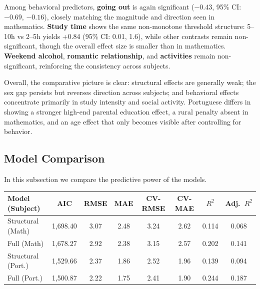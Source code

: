 \documentclass{article}
\begin{document}
\vspace{0.2em}
Among behavioral predictors, \textbf{going out} is again significant ($-0.43$, 95\% CI: $-0.69$, $-0.16$), closely matching the magnitude and direction seen in mathematics. \textbf{Study time} shows the same non-monotone threshold structure: 5--10h vs 2--5h yields +0.84 (95\% CI: 0.01, 1.6), while other contrasts remain non-significant, though the overall effect size is smaller than in mathematics. \textbf{Weekend alcohol}, \textbf{romantic relationship}, and \textbf{activities} remain non-significant, reinforcing the consistency across subjects.

\vspace{0.2em}
Overall, the comparative picture is clear: structural effects are generally weak; the sex gap persists but reverses direction across subjects; and behavioral effects concentrate primarily in study intensity and social activity. Portuguese differs in showing a stronger high-end parental education effect, a rural penalty absent in mathematics, and an age effect that only becomes visible after controlling for behavior.



\subsection{Model Comparison}


In this subsection we compare the predictive power of the models.

\vspace{-0.5em}
\begin{table}[h!]
\centering
\footnotesize
\begin{tabularx}{\textwidth}{lCCCCCCC}
\toprule
\textbf{Model (Subject)} & \textbf{AIC} & \textbf{RMSE} & \textbf{MAE} & \textbf{CV-RMSE} & \textbf{CV-MAE} & \textbf{$R^2$} & \textbf{Adj.\ $R^2$} \\
\midrule
Structural (Math) & 1{,}698.40 & 3.07 & 2.48 & 3.24 & 2.62 & 0.114 & 0.068 \\
Full (Math)       & 1{,}678.27 & 2.92 & 2.38 & 3.15 & 2.57 & 0.202 & 0.141 \\
\midrule
Structural (Port.) & 1{,}529.66 & 2.37 & 1.86 & 2.52 & 1.96 & 0.139 & 0.094 \\
Full (Port.)       & 1{,}500.87 & 2.22 & 1.75 & 2.41 & 1.90 & 0.244 & 0.187 \\
\bottomrule
\end{tabularx}
\end{table}
\end{document}
